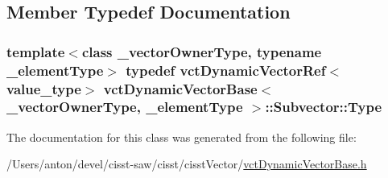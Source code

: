 \subsection{Member Typedef Documentation}
\hypertarget{classvct_dynamic_vector_base_1_1_subvector_a39712115ee3599cf1d241395f1ec645a}{}
\subsubsection[{Type}]{\setlength{\rightskip}{0pt plus 5cm}template$<$class \+\_\+vector\+Owner\+Type, typename \+\_\+element\+Type$>$ typedef {\bf vct\+Dynamic\+Vector\+Ref}$<$value\+\_\+type$>$ {\bf vct\+Dynamic\+Vector\+Base}$<$ \+\_\+vector\+Owner\+Type, \+\_\+element\+Type $>$\+::{\bf Subvector\+::\+Type}}\label{classvct_dynamic_vector_base_1_1_subvector_a39712115ee3599cf1d241395f1ec645a}


The documentation for this class was generated from the following file\+:\begin{DoxyCompactItemize}
\item 
/\+Users/anton/devel/cisst-\/saw/cisst/cisst\+Vector/\hyperlink{vct_dynamic_vector_base_8h}{vct\+Dynamic\+Vector\+Base.\+h}\end{DoxyCompactItemize}
